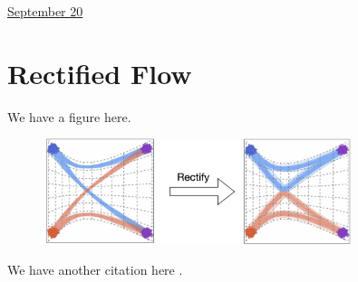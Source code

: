 \documentclass[11pt,letterpaper]{article}
\begin{document}
\href{run:2025-09-20.tex}{\Huge September 20} 

\section{Rectified Flow}

We have a figure here. 
\begin{figure}[h]
\centering 
\includegraphics[width=0.8\textwidth]{assets/figures/2025/curved_reflow.png}
\end{figure} 


We have another citation here \cite{li2022diffusion}. 

 

\end{document}
